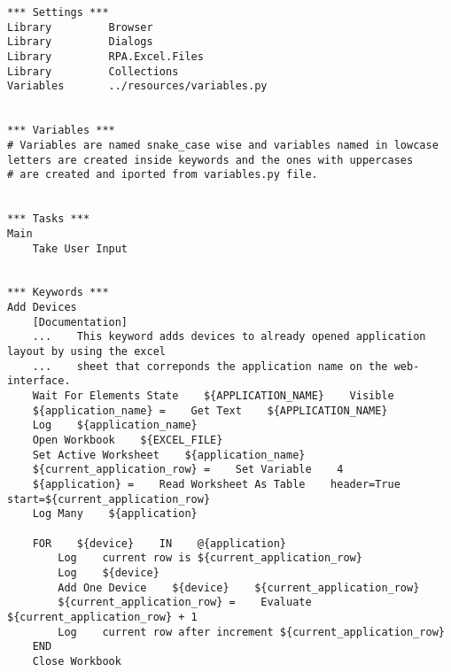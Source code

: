 \begin{verbatim}
*** Settings ***
Library         Browser
Library         Dialogs
Library         RPA.Excel.Files
Library         Collections
Variables       ../resources/variables.py


*** Variables ***
# Variables are named snake_case wise and variables named in lowcase letters are created inside keywords and the ones with uppercases
# are created and iported from variables.py file.


*** Tasks ***
Main
    Take User Input


*** Keywords ***
Add Devices
    [Documentation]
    ...    This keyword adds devices to already opened application layout by using the excel
    ...    sheet that correponds the application name on the web-interface.
    Wait For Elements State    ${APPLICATION_NAME}    Visible
    ${application_name} =    Get Text    ${APPLICATION_NAME}
    Log    ${application_name}
    Open Workbook    ${EXCEL_FILE}
    Set Active Worksheet    ${application_name}
    ${current_application_row} =    Set Variable    4
    ${application} =    Read Worksheet As Table    header=True    start=${current_application_row}
    Log Many    ${application}

    FOR    ${device}    IN    @{application}
        Log    current row is ${current_application_row}
        Log    ${device}
        Add One Device    ${device}    ${current_application_row}
        ${current_application_row} =    Evaluate    ${current_application_row} + 1
        Log    current row after increment ${current_application_row}
    END
    Close Workbook


\end{verbatim}
